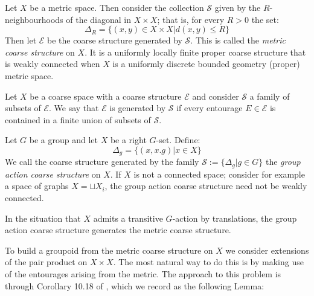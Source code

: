 \begin{example}\label{ex:MCS}
Let $X$ be a metric space. Then consider the collection $\mathcal{S}$ given by the $R$-neighbourhoods of the diagonal in $X\times X$; that is, for every $R>0$ the set:
\begin{equation*}
\Delta_{R}=\lbrace (x,y) \in X \times X | d(x,y)\leq R \rbrace
\end{equation*}
Then let $\mathcal{E}$ be the coarse structure generated by $\mathcal{S}$. This is called the \textit{metric coarse structure} on $X$. It is a uniformly locally finite proper coarse structure that is weakly connected when $X$ is a uniformly discrete bounded geometry (proper) metric space.
\end{example}

\begin{definition}
Let $X$ be a coarse space with a coarse structure $\mathcal{E}$ and consider $\mathcal{S}$ a family of subsets of $\mathcal{E}$. We say that $\mathcal{E}$ is generated by $\mathcal{S}$ if every entourage $E \in \mathcal{E}$ is contained in a finite union of subsets of $\mathcal{S}$.
\end{definition}

\begin{example}\label{ex:GACS}
Let $G$ be a group and let $X$ be a right $G$-set. Define:
\begin{equation*}
\Delta_{g}=\lbrace (x,x.g) | x \in X \rbrace  
\end{equation*}
We call the coarse structure generated by the family $\mathcal{S}:=\lbrace \Delta_{g} | g\in G\rbrace$ the \textit{group action coarse structure} on $X$. If $X$ is not a connected space; consider for example a space of graphs $X=\sqcup X_{i}$, the group action coarse structure need not be weakly connected.
\end{example}

In the situation that $X$ admits a transitive $G$-action by translations, the group action coarse structure generates the metric coarse structure. 

To build a groupoid from the metric coarse structure on $X$ we consider extensions of the pair product on $X \times X$. The most natural way to do this is by making use of the entourages arising from the metric. The approach to this problem is through Corollary 10.18 of \cite{MR2007488}, which we record as the following Lemma:

